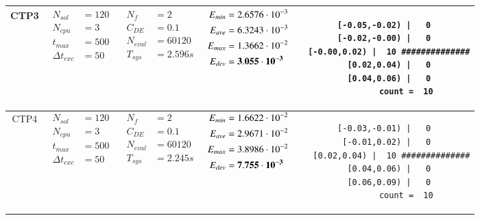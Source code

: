\begin{table*} [!t]
\begin{tabular}[c]{ccccc}
\hline



CTP3
&
{$\!\begin{aligned}
    N_{sol}        &= 120 \\
	N_{cpu}        &= 3 \\
	t_{max}        &= 500 \\
	\Delta t_{exc} &= 50
\end{aligned}$}
&
{$\!\begin{aligned}
	N_{f}    &= 2 \\
	C_{DE}   &= 0.1 \\
	N_{eval} &= 60120 \\
	T_{sys}  &= 2.596s
\end{aligned}$}
&
{$\!\begin{aligned}
    E_{min} &= 2.6576\cdot 10^{-3} \\
    E_{ave} &= 6.3243\cdot 10^{-3} \\
    E_{max} &= 1.3662\cdot 10^{-2} \\
    E_{dev} &= {\bf 3.055\cdot 10^{-3}}
\end{aligned}$}
&
\begin{minipage}{4.1cm} \fontsize{5pt}{6pt}
\begin{verbatim}
 [-0.05,-0.02) |   0 
 [-0.02,-0.00) |   0 
  [-0.00,0.02) |  10 ##############
   [0.02,0.04) |   0 
   [0.04,0.06) |   0 
         count =  10
 \end{verbatim}
\end{minipage} \\

\hline



CTP4
&
{$\!\begin{aligned}
    N_{sol}        &= 120 \\
	N_{cpu}        &= 3 \\
	t_{max}        &= 500 \\
	\Delta t_{exc} &= 50
\end{aligned}$}
&
{$\!\begin{aligned}
	N_{f}    &= 2 \\
	C_{DE}   &= 0.1 \\
	N_{eval} &= 60120 \\
	T_{sys}  &= 2.245s
\end{aligned}$}
&
{$\!\begin{aligned}
    E_{min} &= 1.6622\cdot 10^{-2} \\
    E_{ave} &= 2.9671\cdot 10^{-2} \\
    E_{max} &= 3.8986\cdot 10^{-2} \\
    E_{dev} &= {\bf 7.755\cdot 10^{-3}}
\end{aligned}$}
&
\begin{minipage}{4.1cm} \fontsize{5pt}{6pt}
\begin{verbatim}
 [-0.03,-0.01) |   0 
  [-0.01,0.02) |   0 
   [0.02,0.04) |  10 ##############
   [0.04,0.06) |   0 
   [0.06,0.09) |   0 
         count =  10
 \end{verbatim}
\end{minipage} \\


\end{tabular}
\end{table*}
